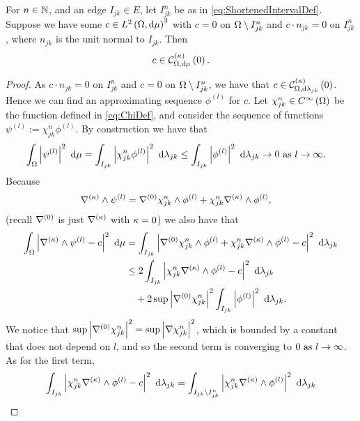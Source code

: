 \begin{lemma} \label{lem:kCurlZeroExtensionLemma}
	For $n\in\mathbb{N}$, and an edge $I_{jk}\in E$, let $I_{jk}^n$ be as in \eqref{eq:ShortenedIntervalDef}.
	Suppose we have some $c\in L^{2}\left( \Omega,\mathrm{d}\mu \right)^3$ with $c=0$ on $\Omega\setminus I_{jk}^n$ and $c\cdot n_{jk} = 0$ on $I_{jk}^n$, where $n_{jk}$ is the unit normal to $I_{jk}$.
	Then
	\begin{align*}
		c\in\mathcal{C}_{ \Omega, \mathrm{d}\mu}^{(\kappa)}\left( 0 \right).
	\end{align*}
\end{lemma}
\begin{proof}
	As $c\cdot n_{jk} = 0$ on $I_{jk}^n$ and $c=0$ on $\Omega\setminus I_{jk}^n$, we have that $c\in\mathcal{C}_{ \Omega, \mathrm{d}\lambda_{jk}}^{(\kappa)}\left( 0 \right)$.
	Hence we can find an approximating sequence $\phi^{(l)}$ for $c$.
	Let $\chi_{jk}^{n}\in C^{\infty}\left( \Omega \right)$ be the function defined in \eqref{eq:ChiDef}, and consider the sequence of functions $\psi^{(l)} := \chi_{jk}^n\phi^{(l)}$.
	By construction we have that
	\begin{align*}
		\int_{\Omega}\left\lvert \psi^{(l)} \right\rvert^2 \ \mathrm{d}\mu
		&= \int_{I_{jk}}\left\lvert \chi_{jk}^n\phi^{(l)} \right\rvert^2 \ \mathrm{d}\lambda_{jk}
		\leq \int_{I_{jk}}\left\lvert \phi^{(l)} \right\rvert^2 \ \mathrm{d}\lambda_{jk}
		\rightarrow 0 \ \text{as} \ l \rightarrow\infty.
	\end{align*}
	Because
	\begin{align*}
		\nabla_{}^{(\kappa)}\wedge\psi^{(l)} &= \nabla^{(0)}\chi_{jk}^n\wedge\phi^{(l)} + \chi_{jk}^n\nabla_{}^{(\kappa)}\wedge\phi^{(l)},
	\end{align*}
	(recall $\nabla^{(0)}$ is just $\nabla^{(\kappa)}{}$ with $\kappa=0$) we also have that
	\begin{align*}
		\int_{\Omega}\left\lvert \nabla_{}^{(\kappa)}\wedge\psi^{(l)} - c \right\rvert^2 \ \mathrm{d}\mu
		&= \int_{I_{jk}}\left\lvert \nabla^{(0)}\chi_{jk}^n\wedge\phi^{(l)} + \chi_{jk}^n\nabla_{}^{(\kappa)}\wedge\phi^{(l)} - c \right\rvert^2 \ \mathrm{d}\lambda_{jk} \\
		&\leq 2\int_{I_{jk}}\left\lvert \chi_{jk}^n\nabla_{}^{(\kappa)}\wedge\phi^{(l)} - c \right\rvert^2 \ \mathrm{d}\lambda_{jk} \\
		&\quad + 2\sup\left\lvert \nabla^{(0)}\chi_{jk}^n \right\rvert^2\int_{I_{jk}}\left\lvert \phi^{(l)} \right\rvert^2 \ \mathrm{d}\lambda_{jk}.
	\end{align*}
	We notice that $\sup\left\lvert \nabla^{(0)}\chi_{jk}^n \right\rvert^2 = \sup\left\lvert \nabla\chi_{jk}^n \right\rvert^2$, which is bounded by a constant that does not depend on $l$, and so the second term is converging to $0 \ \text{as} \ l \rightarrow\infty$.
	As for the first term,
	\begin{align*}
		\integral{I_{jk}}{\abs{\chi_{jk}^n\kcurl{}\phi^{(l)} - c}^2}{\lambda_{jk}}
		&= \integral{I_{jk}\setminus I_{jk}^n}{\abs{\chi_{jk}^n\kcurl{}\phi^{(l)}}^2}{\lambda_{jk}} \\

\end{align*}
\end{proof}
